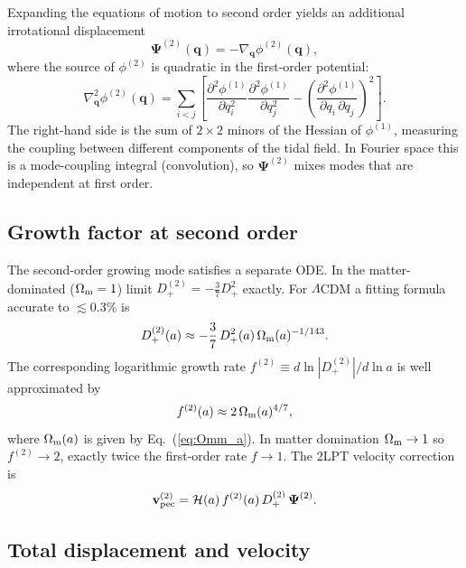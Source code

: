 \documentclass[12pt]{article}
\newcommand{\bq}{\mathbf{q}}
\newcommand{\bPsi}{\boldsymbol{\Psi}}
\newcommand{\bv}{\mathbf{v}}
\newcommand{\Dp}{D_+}
\newcommand{\Dpp}{D_+^{(2)}}
\newcommand{\Omm}{\Omega_{\rm m}}
\newcommand{\calH}{\mathcal{H}}
\begin{document}
Expanding the equations of motion to second order yields an additional
irrotational displacement
%
\begin{equation}
  \bPsi^{(2)}(\bq) = -\nabla_\bq\phi^{(2)}(\bq),
  \label{eq:psi2}
\end{equation}
%
where the source of $\phi^{(2)}$ is quadratic in the first-order
potential:
%
\begin{equation}
  \boxed{
  \nabla_\bq^2\phi^{(2)}(\bq)
    = \sum_{i < j}
      \left[
        \frac{\partial^2\phi^{(1)}}{\partial q_i^2}
        \frac{\partial^2\phi^{(1)}}{\partial q_j^2}
        -
        \left(\frac{\partial^2\phi^{(1)}}{\partial q_i\,\partial q_j}\right)^{\!2}
      \right].
  }
  \label{eq:poisson2}
\end{equation}
%
The right-hand side is the sum of $2\times 2$ minors of the Hessian
of $\phi^{(1)}$, measuring the coupling between different components
of the tidal field.  In Fourier space this is a mode-coupling integral
(convolution), so $\bPsi^{(2)}$ mixes modes that are independent at
first order.

\subsection{Growth factor at second order}
\label{sec:2lpt_growth}

The second-order growing mode satisfies a separate ODE.  In the
matter-dominated ($\Omm = 1$) limit $\Dpp = -\tfrac{3}{7}\Dp^2$
exactly.  For $\Lambda$CDM a fitting formula accurate to
$\lesssim 0.3\%$ is \citep{Crocce2006}
%
\begin{equation}
  \Dpp(a) \approx -\frac{3}{7}\,\Dp^2(a)\,\Omm(a)^{-1/143}.
  \label{eq:D2}
\end{equation}
%
The corresponding logarithmic growth rate
$f^{(2)} \equiv d\ln|\Dpp|/d\ln a$ is well approximated by
\citep{Bouchet1995}
%
\begin{equation}
  f^{(2)}(a) \approx 2\,\Omm(a)^{4/7},
  \label{eq:f2}
\end{equation}
%
where $\Omm(a)$ is given by Eq.~(\ref{eq:Omm_a}).  In matter
domination $\Omm\to 1$ so $f^{(2)}\to 2$, exactly twice the
first-order rate $f\to 1$.  The 2LPT velocity correction is
%
\begin{equation}
  \bv_{\rm pec}^{(2)}
    = \calH(a)\,f^{(2)}(a)\,\Dpp\,\bPsi^{(2)}.
  \label{eq:vel2}
\end{equation}

\subsection{Total displacement and velocity}
\end{document}
